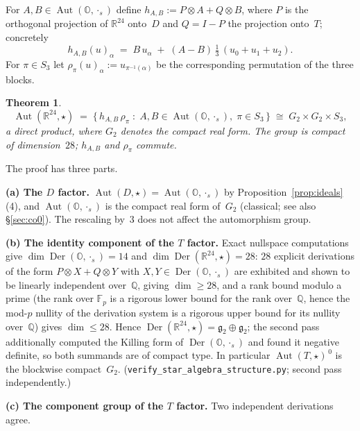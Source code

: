 \documentclass[11pt]{amsart}
\newcommand{\OO}{\mathbb{O}}
\newcommand{\QQ}{\mathbb{Q}}
\newcommand{\FF}{\mathbb{F}}
\newcommand{\RR}{\mathbb{R}}
\DeclareMathOperator{\Aut}{Aut}
\DeclareMathOperator{\Der}{Der}
\newtheorem{theorem}{Theorem}
\theoremstyle{definition}
\theoremstyle{remark}
\begin{document}
For $A, B \in \Aut(\OO, \cdot_s)$ define $h_{A,B} := P \otimes A + Q \otimes B$,
where $P$ is the orthogonal projection of $\RR^{24}$ onto~$D$ and
$Q = I - P$ the projection onto~$T$; concretely
\begin{equation}\label{eq:hAB}
  h_{A,B}(u)_\alpha \;=\; B\,u_\alpha
    \;+\; (A - B)\,\tfrac{1}{3}\,(u_0 + u_1 + u_2).
\end{equation}
For $\pi \in S_3$ let $\rho_\pi(u)_\alpha := u_{\pi^{-1}(\alpha)}$ be the
corresponding permutation of the three blocks.

\begin{theorem}\label{thm:ambient}
\[
  \Aut(\RR^{24}, \star)
  \;=\; \{\, h_{A,B}\, \rho_\pi \;:\;
      A, B \in \Aut(\OO, \cdot_s),\; \pi \in S_3 \,\}
  \;\cong\; G_2 \times G_2 \times S_3 ,
\]
a \emph{direct} product, where $G_2$ denotes the compact real form. The
group is compact of dimension~$28$; $h_{A,B}$ and $\rho_\pi$ commute.
\end{theorem}

The proof has three parts.

\medskip
\noindent\textbf{(a) The $D$ factor.}
$\Aut(D, \star) = \Aut(\OO, \cdot_s)$ by
Proposition~\ref{prop:ideals}(4), and $\Aut(\OO, \cdot_s)$ is the compact
real form of~$G_2$ (classical; see also \S\ref{sec:co0}). The rescaling by~$3$
does not affect the automorphism group.

\medskip
\noindent\textbf{(b) The identity component of the $T$ factor.}
Exact nullspace computations give $\dim \Der(\OO, \cdot_s) = 14$ and
$\dim \Der(\RR^{24}, \star) = 28$: $28$ explicit derivations of the form
$P \otimes X + Q \otimes Y$ with $X, Y \in \Der(\OO, \cdot_s)$ are exhibited
and shown to be linearly independent over~$\QQ$, giving $\dim \geq 28$, and
a rank bound modulo a prime (the rank over $\FF_p$ is a rigorous lower
bound for the rank over~$\QQ$, hence the mod-$p$ nullity of the derivation
system is a rigorous upper bound for its nullity over~$\QQ$) gives
$\dim \leq 28$. Hence
$\Der(\RR^{24}, \star) = \mathfrak{g}_2 \oplus \mathfrak{g}_2$; the second
pass additionally computed the Killing form of $\Der(\OO, \cdot_s)$ and found
it negative definite, so both summands are of compact type. In particular
$\Aut(T, \star)^{\,0}$ is the blockwise compact~$G_2$.
(\texttt{verify\_star\_algebra\_structure.py}; second pass independently.)

\medskip
\noindent\textbf{(c) The component group of the $T$ factor.}
Two independent derivations agree.
\end{document}
